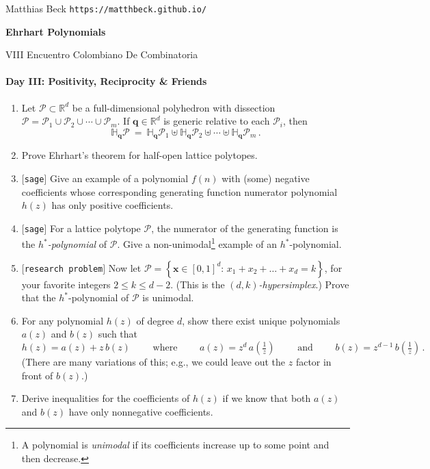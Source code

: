 \documentclass[11pt]{article}
\def\bq{\mathbf{q}}
\def\bx{\mathbf{x}}
\def\cP{\mathcal{P}}
\def\RR{\mathbb{R}}
\def\hopen{\mathbb{H}}
\def\open{$[${\tt research problem}$]$ }
\def\sage{$[${\tt sage}$]$ }
\begin{document}

{\sc Matthias Beck} \hfill {\tt https://matthbeck.github.io/}


\newpage
\begin{center}
\Large{\bf Ehrhart Polynomials} 

\normalsize
VIII Encuentro Colombiano De Combinatoria
\end{center}

\paragraph{Day III: Positivity, Reciprocity \& Friends}

\begin{enumerate}[(1)]
\vspace{-10pt}

\item Let $\cP \subset \RR^d$ be a full-dimensional polyhedron with dissection $\cP = \cP_1 \cup \cP_2 \cup \cdots \cup \cP_m$.
If $\bq \in \RR^d$ is generic relative to each $\cP_i$, then
\[
  \hopen_\bq \cP \ = \ \hopen_\bq \cP_1 \uplus \hopen_\bq \cP_2 \uplus \cdots \uplus
\hopen_\bq \cP_m  \, .
\]

\item Prove Ehrhart's theorem for half-open lattice polytopes.

\item \sage Give an example of a polynomial $f(n)$ with (some) negative coefficients whose corresponding generating function
numerator polynomial $h(z)$ has only positive coefficients.

\item \sage For a lattice polytope $\cP$, the numerator of the generating function is the \emph{$h^*$-polynomial} of $\cP$.
Give a non-unimodal\footnote{
A polynomial is \emph{unimodal} if its coefficients increase up to some point and
then decrease.
} example of an $h^*$-polynomial.

\item \open
Now let
$\cP = \left\{ \bx \in [0,1]^d : \, x_1 + x_2 + \dots + x_d = k \right\}$,
for your favorite integers $2 \le k \le d-2$. 
(This is the \emph{$(d, k)$-hypersimplex}.)
Prove that the $h^*$-polynomial of $\cP$ is unimodal.

\item For any polynomial $h(z)$ of degree $d$, show there exist unique polynomials $a(z)$ and $b(z)$ such that
\[
  h(z) = a(z) + z \, b(z)
  \qquad \text{ where } \qquad a(z) = z^d \, a(\tfrac 1 z) \qquad \text{ and } \qquad b(z) = z^{ d-1 } \, b(\tfrac 1 z) \, .
\]
(There are many variations of this; e.g., we could leave out the $z$ factor in front of $b(z)$.)

\item Derive inequalities for the coefficients of $h(z)$ if we know that both $a(z)$ and $b(z)$ have only nonnegative
coefficients.


\end{enumerate}
\end{document}
